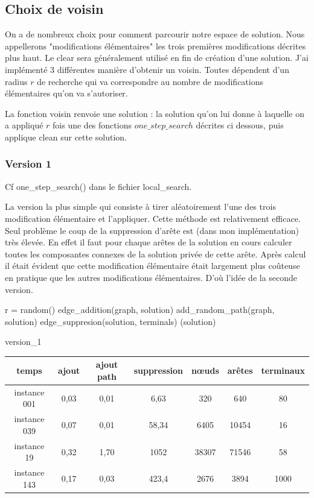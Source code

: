 \documentclass[10pt,a4paper]{article}
\begin{document}
\subsection{Choix de voisin}

On a de nombreux choix pour comment parcourir notre espace de solution. Nous appellerons "modifications élémentaires" les trois premières modifications décrites plus haut. Le clear sera généralement utilisé en fin de création d'une solution. J'ai implémenté 3 différentes manière d'obtenir un voisin. Toutes dépendent d'un radius $ r$ de recherche qui va correspondre au nombre de modifications élémentaires qu'on va s'autoriser. 

La fonction voisin renvoie une solution : la solution qu'on lui donne à laquelle on a appliqué $r$ fois une des fonctions $one\_step\_search$ décrites ci dessous, puis applique clean sur cette solution.

\subsubsection{Version 1}

Cf one\_step\_search() dans le fichier local\_search.

La version la plus simple qui consiste à tirer aléatoirement l'une des trois modification élémentaire et l'appliquer. Cette méthode est relativement efficace. Seul problème le coup de la suppression d'arête est (dans mon implémentation) très élevée. En effet il faut pour chaque arêtes de la solution en cours calculer toutes les composantes connexes de la solution privée de cette arête. Après calcul il était évident que cette modification élémentaire était largement plus coûteuse en pratique que les autres modifications élémentaires. D’où l'idée de la seconde version.

\begin{algorithm}[H]
\SetAlgoLined
{}
r = random()\;
{
	edge\_addition(graph, solution)\;
}
{
	add\_random\_path(graph, solution)\;
}
{
	edge\_suppresion(solution, terminals)\;
}
\Return(solution)\;
\caption{version\_1}
\end{algorithm}


\begin{tabular}{|c|c|c|c|c|c|c|}
\hline 
temps & ajout & ajout path & suppression & nœuds & arêtes & terminaux  \\ 
\hline 
instance 001 & 0,03 & 0,01 & 6,63 & 320 & 640 & 80 \\ 
\hline 
instance 039 & 0,07 & 0,01 & 58,34 & 6405 & 10454 & 16 \\ 
\hline 
instance  19 & 0,32 & 1,70 & 1052 & 38307 & 71546 & 58 \\
\hline 
instance  143 & 0,17 & 0,03 & 423,4 & 2676 & 3894 & 1000 \\ 
\hline 
\end{tabular} 
\end{document}
